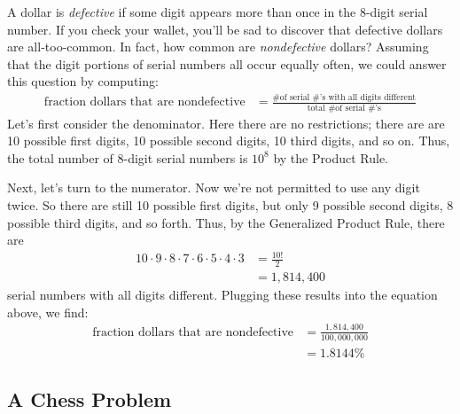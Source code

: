A dollar is \emph{defective} if some digit appears more than once in
the 8-digit serial number.  If you check your wallet, you'll be sad to
discover that defective dollars are all-too-common.  In fact, how
common are \emph{nondefective} dollars?  Assuming that the digit
portions of serial numbers all occur equally often, we could answer
this question by computing:
%
\begin{align*}
\text{fraction dollars that are nondefective}
    & = \frac{\text{\# of serial \#'s with all digits different}}
             {\text{total \# of serial \#'s}}
\end{align*}
%
Let's first consider the denominator.  Here there are no restrictions;
there are are 10 possible first digits, 10 possible second digits, 10
third digits, and so on.  Thus, the total number of 8-digit serial
numbers is $10^8$ by the Product Rule.

Next, let's turn to the numerator.  Now we're not permitted to use any
digit twice.  So there are still 10 possible first digits, but only 9
possible second digits, 8 possible third digits, and so forth.  Thus, by
the Generalized Product Rule, there are
%
\begin{align*}
10 \cdot 9 \cdot 8 \cdot 7 \cdot 6 \cdot 5 \cdot 4 \cdot 3
    & = \frac{10!}{2} \\
    & = 1,814,400
\end{align*}
%
serial numbers with all digits different.  Plugging these results into
the equation above, we find:
%
\begin{align*}
\text{fraction dollars that are nondefective}
    & = \frac{1,814,400}{100,000,000} \\
    & = 1.8144\%
\end{align*}

\subsection{A Chess Problem}

